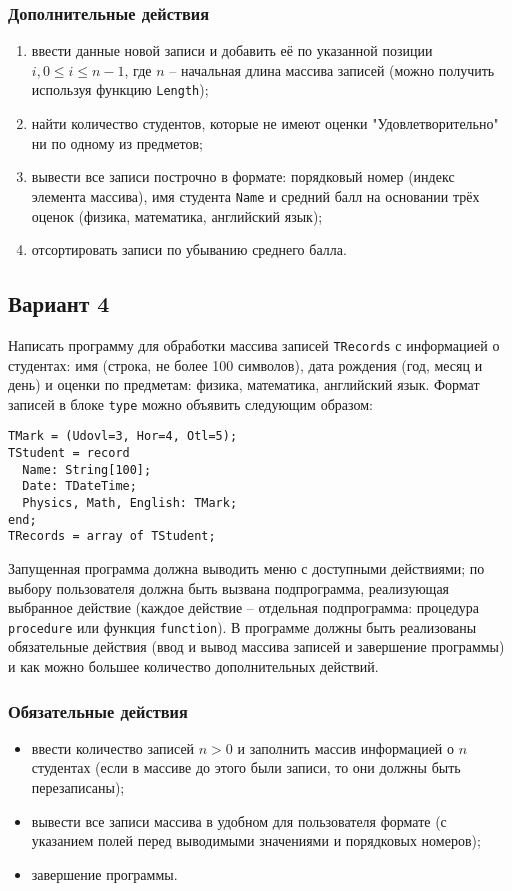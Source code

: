 \documentclass[12pt,a4paper]{report}
\begin{document}
\subsubsection*{Дополнительные действия}
\begin{enumerate}
\item ввести данные новой записи и добавить её по указанной позиции $i, 0 \le i \le n-1$, где $n$ -- начальная длина массива записей (можно получить используя функцию \texttt{Length});
\item найти количество студентов, которые не имеют оценки "Удовлетворительно" ни по одному из предметов;
\item вывести все записи построчно в формате: порядковый номер (индекс элемента массива), имя студента \texttt{Name} и средний балл на основании трёх оценок (физика, математика, английский язык);
\item отсортировать записи по убыванию среднего балла.
\end{enumerate}


\clearpage
\subsection*{Вариант 4}
Написать программу для обработки массива записей \texttt{TRecords} с информацией о студентах: имя (строка, не более 100 символов), дата рождения (год, месяц и день) и оценки по предметам: физика, математика, английский язык.
Формат записей в блоке \texttt{type} можно объявить следующим образом:
\begin{verbatim}
TMark = (Udovl=3, Hor=4, Otl=5);
TStudent = record
  Name: String[100];
  Date: TDateTime;
  Physics, Math, English: TMark;
end;
TRecords = array of TStudent;
\end{verbatim}

Запущенная программа должна выводить меню с доступными действиями; по выбору пользователя должна быть вызвана подпрограмма, реализующая выбранное действие (каждое действие -- отдельная подпрограмма: процедура \texttt{procedure} или функция \texttt{function}). В программе должны быть реализованы обязательные действия (ввод и вывод массива записей и завершение программы) и как можно большее количество дополнительных действий. 

\subsubsection*{Обязательные действия}
\begin{itemize}
\item ввести количество записей $n > 0$ и заполнить массив информацией о $n$ студентах (если в массиве до этого были записи, то они должны быть перезаписаны);
\item вывести все записи массива в удобном для пользователя формате (с указанием полей перед выводимыми значениями и порядковых номеров);
\item завершение программы.
\end{itemize}
\end{document}
